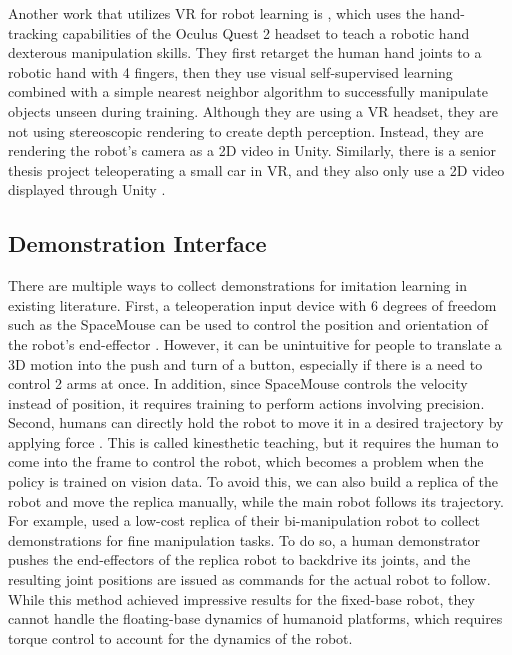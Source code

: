 Another work that utilizes VR for robot learning is \cite{arunachalam2022holodex}, which uses the hand-tracking capabilities of the Oculus Quest 2 headset to teach a robotic hand dexterous manipulation skills. They first retarget the human hand joints to a robotic hand with 4 fingers, then they use visual self-supervised learning combined with a simple nearest neighbor algorithm to successfully manipulate objects unseen during training. Although they are using a VR headset, they are not using stereoscopic rendering to create depth perception. Instead, they are rendering the robot's camera as a 2D video in Unity. Similarly, there is a senior thesis project teleoperating a small car in VR, and they also only use a 2D video displayed through Unity \cite{carvr}. 

\subsection{Demonstration Interface}

There are multiple ways to collect demonstrations for imitation learning in existing literature. First, a teleoperation input device with 6 degrees of freedom such as the SpaceMouse can be used to control the position and orientation of the robot's end-effector \cite{zhu2022robosuite}. However, it can be unintuitive for people to translate a 3D motion into the push and turn of a button, especially if there is a need to control 2 arms at once. In addition, since SpaceMouse controls the velocity instead of position, it requires training to perform actions involving precision. 
Second, humans can directly hold the robot to move it in a desired trajectory by applying force \cite{Akgn2012KeyframebasedLF} \cite{Schulman2013LearningFD}. This is called kinesthetic teaching, but it requires the human to come into the frame to control the robot, which becomes a problem when the policy is trained on vision data. To avoid this, we can also build a replica of the robot and move the replica manually, while the main robot follows its trajectory. For example, \cite{aloha} used a low-cost replica of their bi-manipulation robot to collect demonstrations for fine manipulation tasks. To do so, a human demonstrator pushes the end-effectors of the replica robot to backdrive its joints, and the resulting joint positions are issued as commands for the actual robot to follow. While this method achieved impressive results for the fixed-base robot, they cannot handle the floating-base dynamics of humanoid platforms, which requires torque control to account for the dynamics of the robot. 

